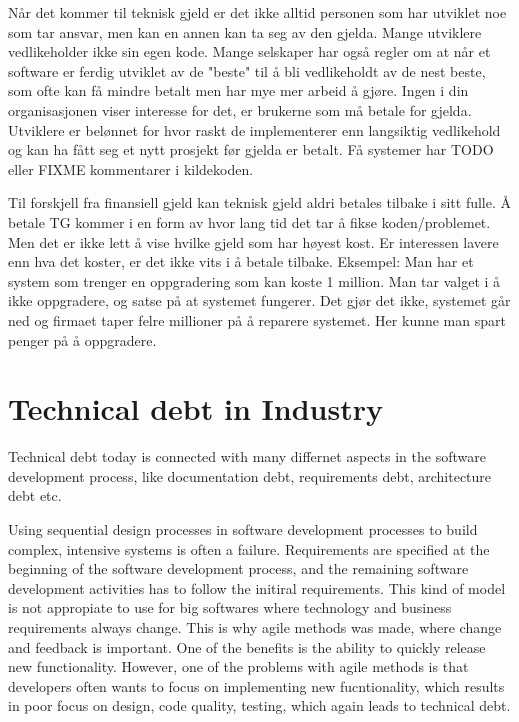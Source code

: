 Når det kommer til teknisk gjeld er det ikke alltid personen som har utviklet noe som tar ansvar, men kan en annen kan ta seg av den gjelda. Mange utviklere vedlikeholder ikke sin egen kode. Mange selskaper har også regler om at når et software er ferdig utviklet av de "beste" til å bli vedlikeholdt av de nest beste, som ofte kan få mindre betalt men har mye mer arbeid å gjøre. Ingen i din organisasjonen viser interesse for det, er brukerne som må betale for gjelda. Utviklere er belønnet for hvor raskt de implementerer enn langsiktig vedlikehold og kan ha fått seg et nytt prosjekt før gjelda er betalt. Få systemer har TODO eller FIXME kommentarer i kildekoden. 

Til forskjell fra finansiell gjeld kan teknisk gjeld aldri betales tilbake i sitt fulle. Å betale TG kommer i en form av hvor lang tid det tar å fikse koden/problemet. Men det er ikke lett å vise hvilke gjeld som har høyest kost. Er interessen lavere enn hva det koster, er det ikke vits i å betale tilbake. Eksempel: Man har et system som trenger en oppgradering som kan koste 1 million. Man tar valget i å ikke oppgradere, og satse på at systemet fungerer. Det gjør det ikke, systemet går ned og firmaet taper felre millioner på å reparere systemet. Her kunne man spart penger på å oppgradere.



\section{Technical debt in Industry}
Technical debt today is connected with many differnet aspects in the software development process, like documentation debt, requirements debt, architecture debt etc. 

Using sequential design processes in software development processes to build complex, intensive systems is often a failure. Requirements are specified at the beginning of the software development process, and the remaining software development activities has to follow the initiral requirements. This kind of model is not appropiate to use for big softwares where technology and business requirements always change. This is why agile methods was made, where change and feedback is important. One of the benefits is the ability to quickly release new functionality. However, one of the problems with agile methods is that developers often wants to focus on implementing new fucntionality, which results in poor focus on design, code quality, testing, which again leads to technical debt.  

